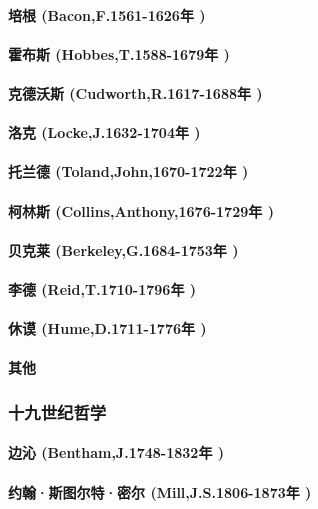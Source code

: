 \documentclass[UTF8]{../RepresentationUniverse}
\begin{document}
    \paragraph{培根 (Bacon,F.1561-1626年 )}
    \paragraph{霍布斯 (Hobbes,T.1588-1679年 )}
    \paragraph{克德沃斯 (Cudworth,R.1617-1688年 )}
    \paragraph{洛克 (Locke,J.1632-1704年 )}
    \paragraph{托兰德 (Toland,John,1670-1722年 )}
    \paragraph{柯林斯 (Collins,Anthony,1676-1729年 )}
    \paragraph{贝克莱 (Berkeley,G.1684-1753年 )}
    \paragraph{李德 (Reid,T.1710-1796年 )}
    \paragraph{休谟 (Hume,D.1711-1776年 )}
    \paragraph{其他}

\subsubsection{十九世纪哲学}
    \paragraph{边沁 (Bentham,J.1748-1832年 )}
    \paragraph{约翰·斯图尔特·密尔 (Mill,J.S.1806-1873年 )}
\end{document}
